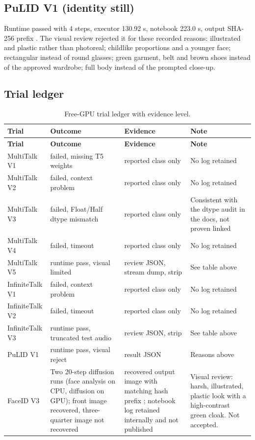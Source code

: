 \documentclass[11pt,a4paper]{article}
\newcommand{\code}[1]{\texttt{\detokenize{#1}}}
\begin{document}
\subsection{PuLID V1 (identity still)}
Runtime passed with 4 steps, executor 130.92 s, notebook 223.0 s, output SHA-256 prefix \code{ee3a5f01}. The visual review rejected it for these recorded reasons: illustrated and plastic rather than photoreal; childlike proportions and a younger face; rectangular instead of round glasses; green garment, belt and brown shoes instead of the approved wardrobe; full body instead of the prompted close-up.

\subsection{Trial ledger}
\begin{longtable}{@{}P{2.4cm}P{4.4cm}P{3.0cm}P{5.7cm}@{}}
\caption{Free-GPU trial ledger with evidence level.}\\
\toprule \textbf{Trial} & \textbf{Outcome} & \textbf{Evidence} & \textbf{Note}\\ \midrule\endfirsthead
\toprule \textbf{Trial} & \textbf{Outcome} & \textbf{Evidence} & \textbf{Note}\\ \midrule\endhead
MultiTalk V1 & failed, missing T5 weights & reported class only & No log retained\\
MultiTalk V2 & failed, context problem & reported class only & No log retained\\
MultiTalk V3 & failed, Float/Half dtype mismatch & reported class only & Consistent with the dtype audit in the docs, not proven linked\\
MultiTalk V4 & failed, timeout & reported class only & No log retained\\
MultiTalk V5 & runtime pass, visual limited & review JSON, stream dump, strip & See table above\\
InfiniteTalk V1 & failed, context problem & reported class only & No log retained\\
InfiniteTalk V2 & failed, timeout & reported class only & No log retained\\
InfiniteTalk V3 & runtime pass, truncated test audio & review JSON, strip & See table above\\
PuLID V1 & runtime pass, visual reject & result JSON & Reasons above\\
FaceID V3 & Two 20-step diffusion runs (face analysis on CPU, diffusion on GPU); front image recovered, three-quarter image not recovered & recovered output image with matching hash prefix \code{7edc4dfa}; notebook log retained internally and not published & Visual review: harsh, illustrated, plastic look with a high-contrast green cloak. Not accepted.\\

\end{longtable}
\end{document}
